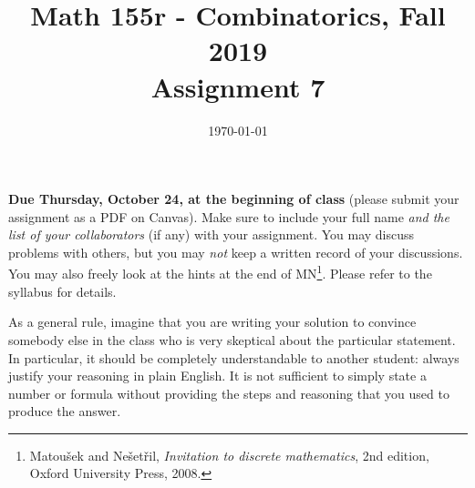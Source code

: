 \documentclass{amsart}
\title[Math 155r, Fall 2019: assignment 7]{Math 155r - Combinatorics, Fall 2019 \\ Assignment 7}
\date{\today}
\theoremstyle{definition}
\begin{document}

\vspace*{-10em}
\maketitle

\textbf{Due Thursday, October 24, at the beginning of class} (please submit your assignment as a PDF on Canvas). Make sure to include your full name \emph{and the list of your collaborators} (if any) with your assignment. You may discuss problems with others, but you may \emph{not} keep a written record of your discussions. You may also freely look at the hints at the end of MN\footnote{Matoušek and Nešetřil, \emph{Invitation to discrete mathematics}, 2nd edition, Oxford University Press, 2008.}. Please refer to the syllabus for details.

As a general rule, imagine that you are writing your solution to convince somebody else in the class who is very skeptical about the particular statement. In particular, it should be completely understandable to another student: always justify your reasoning in plain English. It is not sufficient to simply state a number or formula without providing the steps and reasoning that you used to produce the answer.
\end{document}
